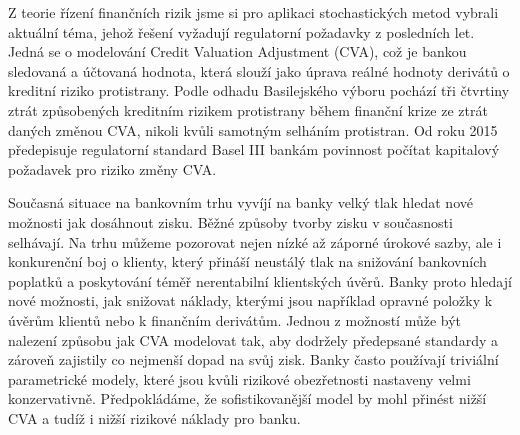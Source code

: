 \documentclass[a4paper,12pt]{report}
\theoremstyle{definition} \newtheorem{definice}[veta]{Definice}
\theoremstyle{remark}
\begin{document}

Z teorie řízení finančních rizik jsme si pro aplikaci stochastických metod vybrali aktuální téma, jehož řešení vyžadují regulatorní požadavky z posledních let.
Jedná se o modelování Credit Valuation Adjustment (CVA), což je bankou sledovaná a účtovaná hodnota, která slouží jako úprava reálné hodnoty derivátů o kreditní riziko protistrany.
Podle odhadu Basilejského výboru pochází tři čtvrtiny ztrát způsobených kreditním rizikem protistrany během finanční krize ze ztrát daných změnou CVA, nikoli kvůli samotným selháním protistran. 
Od roku 2015 předepisuje regulatorní standard Basel III bankám povinnost počítat kapitalový požadavek pro riziko změny CVA.

Současná situace na bankovním trhu vyvíjí na banky velký tlak hledat nové možnosti jak dosáhnout zisku.
Běžné způsoby tvorby zisku v současnosti selhávají.
Na trhu můžeme pozorovat nejen nízké až záporné úrokové sazby, ale i konkurenční boj o klienty, který přináší neustálý tlak na snižování bankovních poplatků a poskytování téměř nerentabilní klientských úvěrů.
Banky proto hledají nové možnosti, jak snižovat náklady, kterými jsou například opravné položky k úvěrům klientů nebo k finančním derivátům.
Jednou z možností může být nalezení způsobu jak CVA modelovat tak, aby dodržely předepsané standardy a zároveň zajistily co nejmenší dopad na svůj zisk. 
Banky často používají triviální parametrické modely, které jsou kvůli rizikové obezřetnosti nastaveny velmi konzervativně.
Předpokládáme, že sofistikovanější model by mohl přinést nižší CVA a tudíž i nižší rizikové náklady pro banku. 
\end{document}
